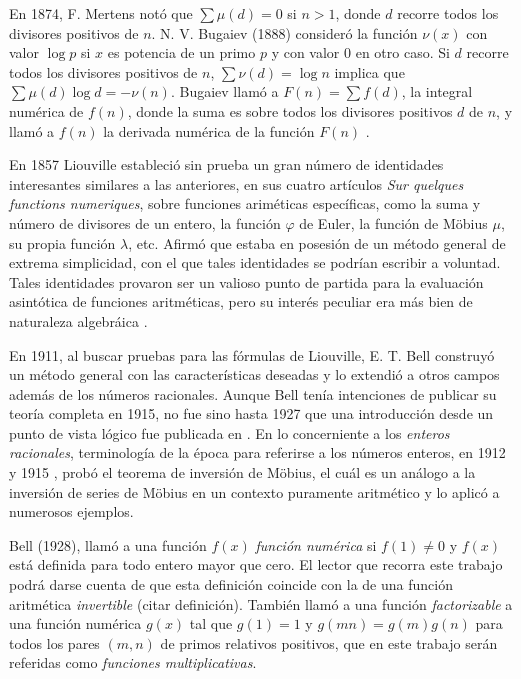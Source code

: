 En 1874, F. Mertens notó que $\sum \mu(d) = 0$ si $n>1$, donde $d$ recorre todos los divisores positivos de $n$.
N. V. Bugaiev (1888) consideró la función $\nu(x)$ con valor $\log p$ si $x$ es potencia de un primo $p$ y con valor 0 en otro caso. Si $d$ recorre todos los divisores positivos de $n$, $\sum \nu(d) = \log n$ implica que $\sum \mu(d) \log d = -\nu(n)$. Bugaiev llamó a $F(n) = \sum f(d)$, la integral numérica de $f(n)$, donde la suma es sobre todos los divisores positivos $d$ de $n$, y llamó a $f(n)$ la derivada numérica de la función $F(n)$ \cite{Di1}.
\bigskip

En 1857 Liouville estableció sin prueba un gran número de identidades interesantes similares a las anteriores, en sus cuatro artículos \emph{Sur quelques functions numeriques}, sobre funciones ariméticas específicas, como la suma y número de divisores de un entero, la función $\varphi$ de Euler, la función de Möbius $\mu$, su propia función $\lambda$, etc. Afirmó que estaba en posesión de un método general de extrema simplicidad, con el que tales identidades se podrían escribir a voluntad. Tales identidades provaron ser un valioso punto de partida para la evaluación asintótica de funciones aritméticas, pero su interés peculiar era más bien  de naturaleza algebráica \cite{Bell1}. 
\bigskip

En 1911, al buscar pruebas para las fórmulas de Liouville, E. T. Bell construyó un método general con las características deseadas y lo extendió a otros campos además de los números racionales. Aunque Bell tenía intenciones de publicar su teoría completa en 1915, no fue sino hasta 1927 que una introducción desde un punto de vista lógico fue publicada en \cite{Bell2}. En lo concerniente a los \textit{enteros racionales}, terminología de la época para referirse a los números enteros, en 1912 y 1915 \cite{Bell1}, probó el teorema de inversión de Möbius, el cuál es un análogo a la inversión de series de Möbius en un contexto puramente aritmético y lo aplicó a numerosos ejemplos.
\bigskip

Bell (1928), llamó a una función $f(x)$ \emph{función numérica} si $f(1) \ne 0$ y $f(x)$ está definida para todo entero mayor que cero. El lector que recorra este trabajo podrá darse cuenta de que esta definición coincide con la de una función aritmética \emph{invertible} (\textsf{citar definición}). También llamó a una función \emph{factorizable} a una función numérica $g(x)$ tal que $g(1)=1$ y $g(m n)=g(m)g(n)$ para todos los pares $(m,n)$ de primos relativos positivos, que en este trabajo serán referidas como \emph{funciones multiplicativas}.
\bigskip

